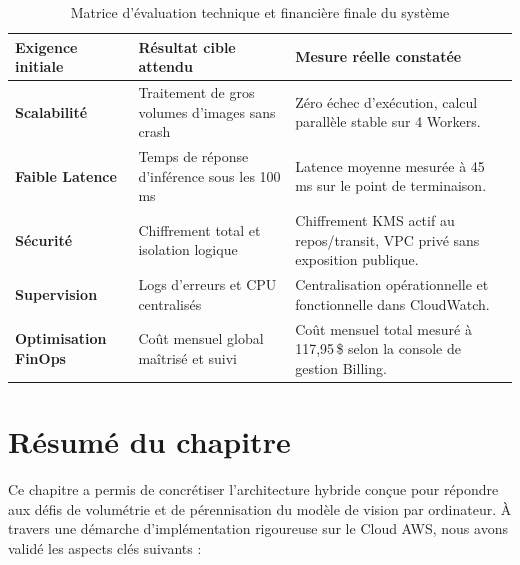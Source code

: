 \begin{table}[H]
\centering
\caption{Matrice d'évaluation technique et financière finale du système}
\label{tab:matrice_evaluation_finale}
\renewcommand{\arraystretch}{1.4}
\begin{tabular}{|p{3cm}|p{5.5cm}|p{5.5cm}|}
\hline
\rowcolor{darkgreen!20} \textbf{Exigence initiale} & \textbf{Résultat cible attendu} & \textbf{Mesure réelle constatée} \\ \hline
\textbf{Scalabilité} & Traitement de gros volumes d'images sans crash & Zéro échec d'exécution, calcul parallèle stable sur 4 Workers. \\ \hline
\textbf{Faible Latence} & Temps de réponse d'inférence sous les 100 ms & Latence moyenne mesurée à 45 ms sur le point de terminaison. \\ \hline
\textbf{Sécurité} & Chiffrement total et isolation logique & Chiffrement KMS actif au repos/transit, VPC privé sans exposition publique. \\ \hline
\textbf{Supervision} & Logs d'erreurs et CPU centralisés & Centralisation opérationnelle et fonctionnelle dans CloudWatch. \\ \hline
\textbf{Optimisation FinOps} & Coût mensuel global maîtrisé et suivi & Coût mensuel total mesuré à 117,95\,\$ selon la console de gestion Billing. \\ \hline
\end{tabular}
\end{table}


\section{Résumé du chapitre}
\label{sec:resume_chapitre_impl}

Ce chapitre a permis de concrétiser l'architecture hybride conçue pour répondre aux défis de volumétrie et de pérennisation du modèle de vision par ordinateur. À travers une démarche d'implémentation rigoureuse sur le Cloud AWS, nous avons validé les aspects clés suivants :

